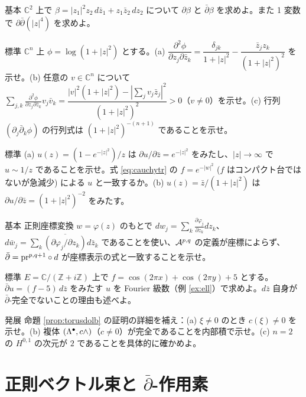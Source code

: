 \begin{prob}{基本}\label{p:dbarcalc}
$\mathbb C^2$ 上で $\beta=|z_1|^2z_2\,d\bar z_1+z_1\bar z_2\,dz_2$ について $\partial\beta$ と $\bar\partial\beta$ を求めよ。また 1 変数で $\partial\bar\partial(|z|^4)$ を求めよ。
\end{prob}
\begin{prob}{標準}\label{p:logg}
$\mathbb C^n$ 上 $\phi=\log(1+|z|^2)$ とする。(a) $\dfrac{\partial^2\phi}{\partial z_j\partial\bar z_k}=\dfrac{\delta_{jk}}{1+|z|^2}-\dfrac{\bar z_jz_k}{(1+|z|^2)^2}$ を示せ。(b) 任意の $v\in\mathbb C^n$ について $\sum_{j,k}\frac{\partial^2\phi}{\partial z_j\partial\bar z_k}v_j\bar v_k=\dfrac{|v|^2(1+|z|^2)-|\sum_jv_j\bar z_j|^2}{(1+|z|^2)^2}>0$（$v\ne0$）を示せ。(c) 行列 $(\partial_j\bar\partial_k\phi)$ の行列式は $(1+|z|^2)^{-(n+1)}$ であることを示せ。
\end{prob}
\begin{prob}{標準}\label{p:solve}
(a) $u(z)=(1-e^{-|z|^2})/z$ は $\partial u/\partial\bar z=e^{-|z|^2}$ をみたし、$|z|\to\infty$ で $u\sim1/z$ であることを示せ。式 \eqref{eq:cauchytr} の $f=e^{-|w|^2}$ ($f$ はコンパクト台ではないが急減少) による $u$ と一致するか。(b) $u(z)=\bar z/(1+|z|^2)$ は $\partial u/\partial\bar z=(1+|z|^2)^{-2}$ をみたす。
\end{prob}
\begin{prob}{基本}\label{p:coordindep}
正則座標変換 $w=\varphi(z)$ のもとで $dw_j=\sum_k\frac{\partial\varphi_j}{\partial z_k}dz_k$、$d\bar w_j=\sum_k\overline{(\partial\varphi_j/\partial z_k)}d\bar z_k$ であることを使い、$\mathcal A^{p,q}$ の定義が座標によらず、$\bar\partial=\mathrm{pr}^{p,q+1}\circ d$ が座標表示の式と一致することを示せ。
\end{prob}

\begin{prob}{標準}\label{p:fourier}
$E=\mathbb C/(\mathbb Z+i\mathbb Z)$ 上で $f=\cos(2\pi x)+\cos(2\pi y)+5$ とする。$\bar\partial u=(f-5)\,d\bar z$ をみたす $u$ を Fourier 級数（例 \ref{ex:ell}）で求めよ。$d\bar z$ 自身が $\bar\partial$-完全でないことの理由も述べよ。
\end{prob}
\begin{prob}{発展}\label{p:torusfourier}
命題 \ref{prop:torusdolb} の証明の詳細を補え：(a) $\xi\ne0$ のとき $c(\xi)\ne0$ を示せ。(b) 複体 $(\Lambda^\bullet,c\wedge)$（$c\ne0$）が完全であることを内部積で示せ。(c) $n=2$ の $H^{0,1}$ の次元が $2$ であることを具体的に確かめよ。
\end{prob}


\section{正則ベクトル束と $\bar\partial$-作用素}\label{sec:holbundle}

